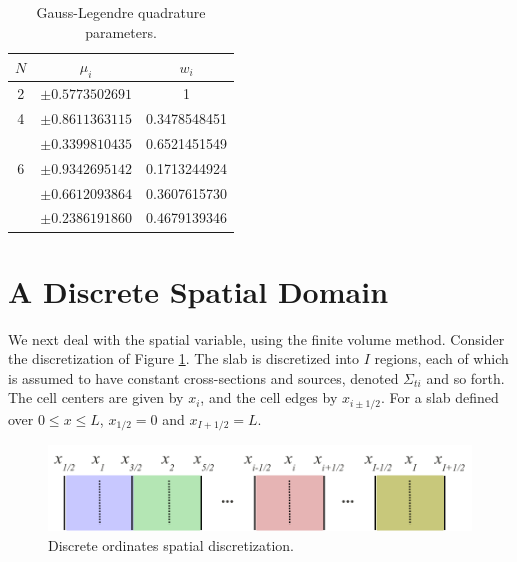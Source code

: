 \begin{table}[ht]
 \caption{Gauss-Legendre quadrature parameters.}
 \begin{center} 
 {\small
 \begin{tabular*}{0.50\textwidth}{@{\extracolsep{\fill}} ccc} 
  \toprule 
    $N$   & $\mu_i$ & $w_i$   \\
  \midrule      
    2     &  $\pm 0.5773502691$  &  1  \\
  \midrule 
    4     &  $\pm 0.8611363115$  &  0.3478548451  \\
          &  $\pm 0.3399810435$  &  0.6521451549  \\
  \midrule      
    6     &  $\pm 0.9342695142$  &  0.1713244924  \\
          &  $\pm 0.6612093864$  &  0.3607615730  \\
          &  $\pm 0.2386191860$  &  0.4679139346  \\
  \bottomrule 
 \end{tabular*}
 } 
 \end{center} 
 \label{tbl:gaussquad}  
\end{table}


\section*{A Discrete Spatial Domain}

We next deal with the spatial variable, using the finite volume method.  Consider the discretization of Figure \ref{fig:sndisc}.  The slab is discretized into $I$ regions, each of which is assumed to have constant cross-sections and sources, denoted $\Sigma_{ti}$ and so forth.  The cell centers are given by $x_i$, and the cell edges by $x_{i\pm 1/2}$.  For a slab defined over $0 \leq x \leq L$, $x_{1/2} = 0$ and $x_{I+1/2} = L$.

\begin{figure}[ht] 
    \centering
    \includegraphics[keepaspectratio, width = 5.0 in]{images/sndisc}
    \caption{Discrete ordinates spatial discretization.}
    \label{fig:sndisc}
\end{figure}

